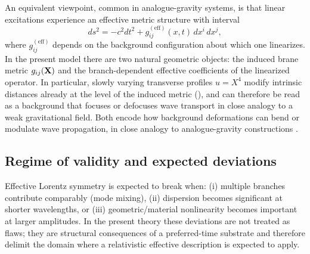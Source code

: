 An equivalent viewpoint, common in analogue-gravity systems, is that linear excitations experience an
effective metric structure with interval
\begin{equation}
  ds^2 = -c^2 dt^2 + g^{(\text{eff})}_{ij}(x,t)\,dx^i\,dx^j,
  \label{eq:effective-metric-interval}
\end{equation}
where $g^{(\text{eff})}_{ij}$ depends on the background configuration about which one linearizes.
In the present model there are two natural geometric objects: the induced brane metric $g_{ij}(\mathbf{X})$
and the branch-dependent effective coefficients of the linearized operator.
In particular, slowly varying transverse profiles $u=X^4$ modify intrinsic distances already at the level of the induced metric (), and can therefore be read as a background that focuses or defocuses wave transport in close analogy to a weak gravitational field.
Both encode how background deformations can bend or modulate wave propagation, in close analogy to
analogue-gravity constructions \citep{Barcelo2011AnalogueGravity,Volovik2003HeliumDroplet}.

\subsection{Regime of validity and expected deviations}

Effective Lorentz symmetry is expected to break when:
(i) multiple branches contribute comparably (mode mixing),
(ii) dispersion becomes significant at shorter wavelengths, or
(iii) geometric/material nonlinearity becomes important at larger amplitudes.
In the present theory these deviations are not treated as flaws; they are structural consequences of a
preferred-time substrate and therefore delimit the domain where a relativistic effective description is expected
to apply.
